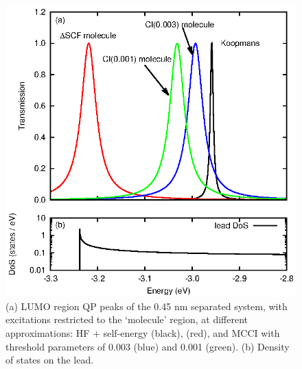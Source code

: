\begin{figure}
	\begin{center}
		\includegraphics[width=0.9\linewidth]{figures/figure5a_5b}
	\end{center}
	\caption{(a) LUMO region \ac{QP} peaks of the 0.45 nm separated
	         system, with excitations restricted to the `molecule' region,
		 at different approximations: HF + self-energy (black),
		 \dscf (red), and MCCI with threshold parameters of
		 0.003 (blue) and 0.001 (green). (b) Density of states on the
		 lead.}
	\label{fig:all45Alumo}
\end{figure}

